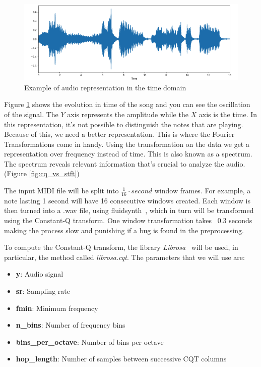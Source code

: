 \begin{figure}[h!]
	\caption[Example of audio representation in the time domain]{ Example of audio representation in the time domain~\cite{genre_class} }
	\centering
	\label{fig:waveform}
	\includegraphics[width=1\textwidth, height=\textheight, keepaspectratio]{"resources/waveform"}
\end{figure}

Figure \ref{fig:waveform} shows the evolution in time of the song and you can see the oscillation of the signal. The $Y$ axis represents the amplitude while the $X$ axis is the time. In this representation, it's not possible to distinguish the notes that are playing. Because of this, we need a better representation. This is where the Fourier Transformations come in handy. Using the transformation on the data we get a representation over frequency instead of time. This is also known as a spectrum. The spectrum reveals relevant information that's crucial to analyze the audio. (Figure \ref{fig:cq_vs_stft})
\par

The input MIDI file will be split into $\frac{1}{16}\cdot second$ window frames. For example, a note lasting 1 second will have 16 consecutive windows created. Each window is then turned into a .wav file, using fluidsynth~\cite{fluidsynth}, which in turn will be transformed using the Constant-Q transform.
One window transformation takes ~0.3 seconds making the process slow and punishing if a bug is found in the preprocessing.

\par
To compute the Constant-Q transform, the library \textit{Librosa}~\cite{librosa} will be used, in particular, the method called \textit{librosa.cqt}.
The parameters that we will use are:
\begin{itemize}
	\item \textbf{y}: Audio signal
	\item \textbf{sr}: Sampling rate
	\item \textbf{fmin}: Minimum frequency
	\item \textbf{n\_bins}: Number of frequency bins
	\item \textbf{bins\_per\_octave}: Number of bins per octave
	\item \textbf{hop\_length}: Number of samples between successive CQT columns
\end{itemize}
\par

